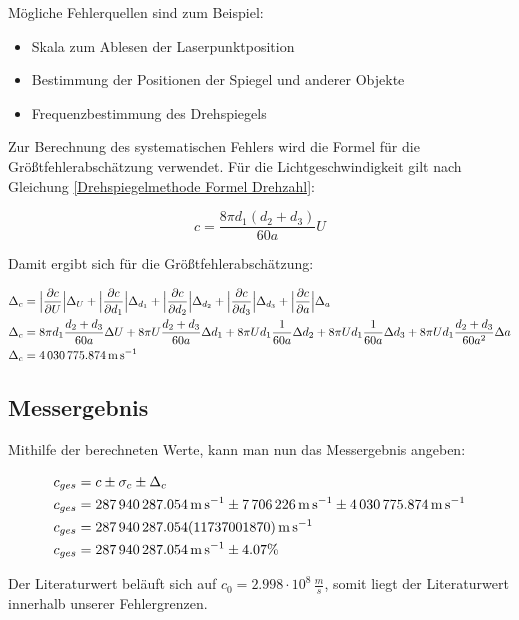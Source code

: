 Mögliche Fehlerquellen sind zum Beispiel:
\begin{itemize}
    \item Skala zum Ablesen der Laserpunktposition
    \item Bestimmung der Positionen der Spiegel und anderer Objekte
    \item Frequenzbestimmung des Drehspiegels
\end{itemize}

Zur Berechnung des systematischen Fehlers wird die Formel für die Größtfehlerabschätzung verwendet. Für die Lichtgeschwindigkeit gilt nach Gleichung \ref{Drehspiegelmethode Formel Drehzahl}:

\begin{equation}
    c = \frac{8 \pi  d_1 (d_2 + d_3)}{60a} U
\end{equation}

Damit ergibt sich für die Größtfehlerabschätzung:

\begin{align}
    \Delta_c &= \Bigl| \frac{\partial c}{\partial U} \Bigl| \Delta_U + \Bigl|
    \frac{\partial c}{\partial d_1} \Bigl| \Delta_{d_1} + \Bigl| \frac{\partial
    c}{\partial d_2} \Bigl| \Delta_{d_2} + \Bigl| \frac{\partial c}{\partial d_3}
    \Bigl| \Delta_{d_3} + \Bigl| \frac{\partial c}{\partial a} \Bigl| \Delta_a \\
    \Delta_c &= 8 \pi d_1 \frac{d_2 + d_3}{60a}\Delta U + 8 \pi U \frac{d_2 + d_3}{60a}\Delta d_1 + 8 \pi U d_1 \frac{1}{60a} \Delta d_2 + 8 \pi U d_1 \frac{1}{60a} \Delta d_3 + 8 \pi U d_1 \frac{d_2 + d_3 }{60a^2} \Delta a \\
    \Delta_c &= \SI{4030775.874}{\metre\per\second}
\end{align}

\subsection{Messergebnis}

Mithilfe der berechneten Werte, kann man nun das Messergebnis angeben:

\begin{align}
    c_{ges} &= c \pm \sigma_c \pm \Delta_c \\
    c_{ges} &= \SI{287940287.054}{\metre\per\second} \pm \SI{7706226}{\metre\per\second} \pm  \SI{4030775.874}{\metre\per\second}\\
    c_{ges} &= \SI{287940287.054 \pm 11737001.87}{\metre\per\second} \\
     c_{ges} &= \SI{287940287.054}{\metre\per\second} \pm 4.07 \%
\end{align}

Der Literaturwert beläuft sich auf $c_0 = 2.998 \cdot 10^8 \, \frac{m}{s}$, somit liegt der Literaturwert innerhalb unserer Fehlergrenzen.